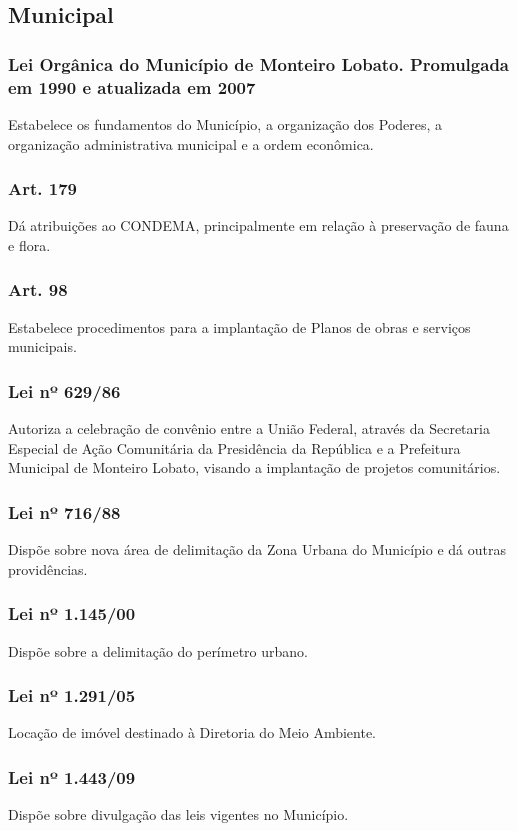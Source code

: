 \begin{subapend}
	\subsection{Municipal}
	\begin{subsubapend}
		\item \subsubsection{Lei Orgânica do Município de Monteiro Lobato. Promulgada em 1990 e atualizada em 2007}
		Estabelece os fundamentos do Município, a organização dos Poderes, a organização administrativa municipal e a ordem econômica.
		\subsubsection{Art. 179} 
		Dá atribuições ao CONDEMA, principalmente em relação à preservação de fauna e flora.
		\subsubsection{Art. 98}
		Estabelece procedimentos para a implantação de Planos de obras e serviços municipais.
		\subsubsection{Lei nº 629/86}
		Autoriza a celebração de convênio entre a União Federal, através da Secretaria Especial de Ação Comunitária da Presidência da República e a Prefeitura Municipal de Monteiro Lobato, visando a implantação de projetos comunitários.
		\subsubsection{Lei nº 716/88}
		Dispõe sobre nova área de delimitação da Zona Urbana do Município e dá outras providências.
		\subsubsection{Lei nº 1.145/00}
		Dispõe sobre a delimitação do perímetro urbano.
		\subsubsection{Lei nº 1.291/05}
		Locação de imóvel destinado à Diretoria do Meio Ambiente.
		\subsubsection{Lei nº 1.443/09}
		Dispõe sobre divulgação das leis vigentes no Município.

\end{subsubapend}
\end{subapend}
